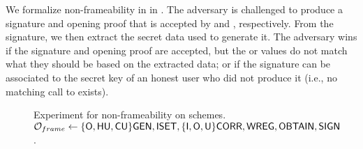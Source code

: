 We formalize non-frameability in \ExpNonframe in .
The adversary is challenged to produce a signature
and opening proof that is accepted by \Verify and \Judge, respectively. From
the signature, we then extract the secret data used to generate it. The
adversary wins if the signature and opening proof are accepted, but the \yeval
or \yinsp values do not match what they should be based on the extracted data;
or if the signature can be associated to the secret key of an honest user who
did not produce it (i.e., no matching call to \SIGN exists).

\begin{figure}[htp!]  
  \centering
  \caption{Experiment for non-frameability on \UAS schemes.
    $\mathcal{O}_{frame} \gets \lbrace\mathsf{O},\mathsf{HU},\mathsf{CU}\rbrace\mathsf{GEN},\mathsf{ISET},\lbrace\mathsf{I},\mathsf{O},\mathsf{U}\rbrace
    \mathsf{CORR},\mathsf{WREG},\mathsf{OBTAIN},\mathsf{SIGN}$.}
  \label{fig:exp-uas-frame}
\end{figure}

